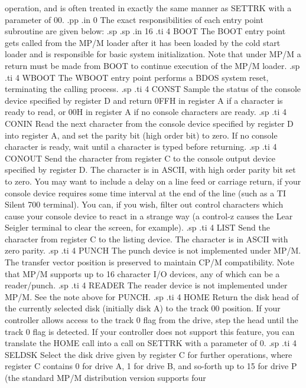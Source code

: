 operation, and is often treated in exactly the same manner as SETTRK
with a parameter of 00.
.pp
.in 0
The exact responsibilities of each entry point subroutine are
given below:
.sp
.sp
.in 16
.ti 4
BOOT        The BOOT entry point gets called from the MP/M loader
after it has been loaded by the cold start
loader and is responsible for basic system initialization.
Note that under MP/M a return must be made from BOOT to continue
execution of the MP/M loader.
.sp
.ti 4
WBOOT       The WBOOT entry point performs a BDOS system reset,
terminating the calling process.
.sp
.ti 4
CONST       Sample the status of the console device specified by
register D
and return 0FFH in register A if a character is ready to read,
or 00H in register A if no console characters are ready.
.sp
.ti 4
CONIN       Read the next character from the console device specified
by register D into register A, and set
the parity bit (high order bit) to zero.  If no console character is
ready, wait until a character is typed before returning.
.sp
.ti 4
CONOUT      Send the character from register C to the console output
device specified by register D.  The character is in ASCII, with high
order parity bit set to
zero.  You may want to include a delay on a line feed or carriage
return, if your console device requires some time interval at the end
of the line (such as a TI Silent 700 terminal).  You can, if you
wish, filter out control characters which cause your console device
to react in a strange way (a control-z causes the Lear Seigler
terminal to clear the screen, for example).
.sp
.ti 4
LIST        Send the character from register C to the
listing device.  The character is in ASCII with zero parity.
.sp
.ti 4
PUNCH       The punch device is not implemented under MP/M.  The
transfer vector position is preserved to maintain CP/M compatibility.
Note that MP/M supports up to 16 character I/O devices, any of which
can be a reader/punch.
.sp
.ti 4
READER      The reader device is not implemented under MP/M.  See the
note above for PUNCH.
.sp
.ti 4
HOME        Return the disk head of the currently selected disk
(initially disk A) to the track 00 position.  If your controller
allows access to the track 0 flag from the drive, step the head until
the track 0 flag is detected.  If your controller does not support
this feature, you can translate the HOME call into a call on SETTRK
with a parameter of 0.
.sp
.ti 4
SELDSK      Select the disk drive given by register C for further
operations, where register C contains 0 for drive A, 1 for drive
B, and so-forth up to 15 for drive P (the
standard MP/M distribution version supports four
